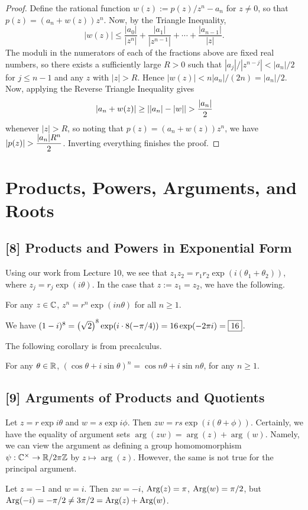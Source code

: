 \documentclass{article}
\begin{document}
\begin{proof}
Define the rational function $w(z) := p(z)/z^n - a_n$ for $z\neq 0$, so that $p(z) = (a_n + w(z))z^n$. Now, by the Triangle Inequality,
$$|w(z)| \leq \frac{|a_0|}{|z^n|} + \frac{|a_1|}{|z^{n-1}|} + \cdots + \frac{|a_{n-1}|}{|z|}.$$
The moduli in the numerators of each of the fractions above are fixed real numbers, so there exists a sufficiently large $R>0$ such that $|a_j| / |z^{n-j}| < |a_n|/2$ for $j\leq n-1$ and any $z$ with $|z|>R$. Hence $|w(z)| < n|a_n|/(2n) = |a_n|/2$. Now, applying the Reverse Triangle Inequality gives
$$|a_n+w(z)| \geq \left||a_n| - |w|\right| > \frac{|a_n|}2$$
whenever $|z|>R$, so noting that $p(z) = (a_n+w(z)) z^n$, we have $|p(z)| > \displaystyle\frac{|a_n|R^n}2$. Inverting everything finishes the proof.
\end{proof}
\section{Products, Powers, Arguments, and Roots}
\subsection*{[8] Products and Powers in Exponential Form}
Using our work from Lecture 10, we see that $z_1 z_2 = r_1r_2\exp(i(\theta_1+\theta_2))$, where $z_j = r_j\exp(i\theta)$. In the case that $z := z_1 = z_2$, we have the following.
\begin{proposition}
For any $z\in\mathbb C$, $z^n = r^n\exp(in\theta)$ for all $n\geq 1$.
\end{proposition}
\begin{example}
We have $(1-i)^8 = \left(\sqrt 2 \right)^8 \exp(i \cdot 8(-\pi/4)) = 16\exp(-2\pi i) = \boxed{16}$.
\end{example}

The following corollary is from precalculus.
\begin{corollary}
For any $\theta\in\mathbb R$, $(\cos \theta + i\sin \theta)^n = \cos n\theta + i\sin n\theta$, for any $n\geq 1$.
\end{corollary}
\subsection*{[9] Arguments of Products and Quotients}
Let $z=r\exp i\theta$ and $w=s\exp i\phi$. Then $zw = rs\exp(i(\theta+\phi))$. Certainly, we have the equality of argument sets $\arg(zw) = \arg(z) + \arg(w)$. Namely, we can view the argument as defining a group homomomorphism $\psi: \mathbb C^\times \to \mathbb R/2\pi \mathbb Z$ by $z\mapsto \arg(z)$. However, the same is not true for the principal argument.
\begin{example}
Let $z=-1$ and $w=i$. Then $zw=-i$, $\operatorname{Arg}(z) = \pi$, $\operatorname{Arg}(w) = \pi/2$, but $\operatorname{Arg}(-i) = -\pi/2 \neq 3\pi/2 = \operatorname{Arg}(z) + \operatorname{Arg}(w)$.
\end{example}
\end{document}
